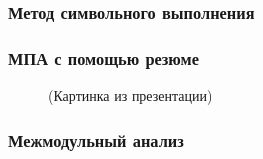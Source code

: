 \documentclass[14pt]{beamer}
\begin{document}
\begin{frame}
\frametitle{Метод символьного выполнения}
\begin{figure}[h]
\end{figure}
\end{frame}

\begin{frame}
\frametitle{МПА с помощью резюме}
\begin{figure}[h]
(Картинка из презентации)
\end{figure}
\end{frame}

\begin{frame}
\frametitle{Межмодульный анализ}
\begin{figure}[h]
\end{figure}
\end{frame}
\end{document}
